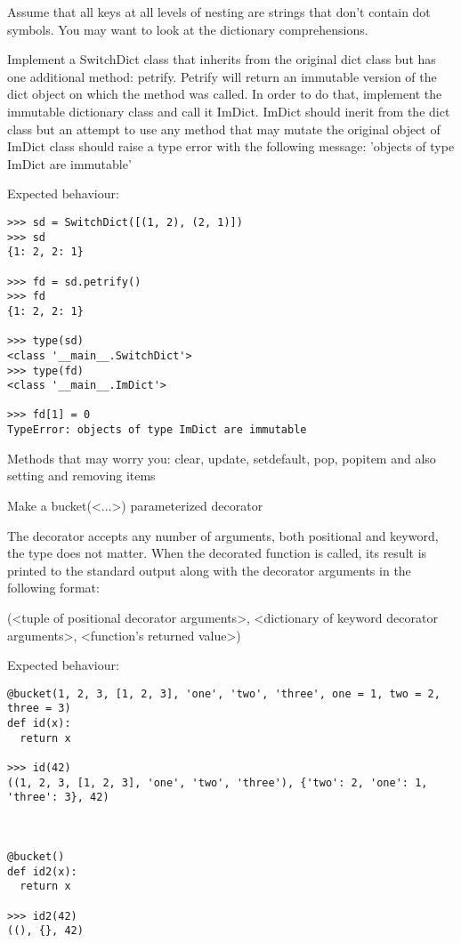 \documentclass[]{article}
\begin{document}
Assume that all keys at all levels of nesting are strings that don't contain dot symbols.
You may want to look at the dictionary comprehensions.

\item
Implement a SwitchDict class that inherits from the original dict class but has one additional method: petrify. Petrify will return an immutable version of the dict object on which the method was called. In order to do that, implement the immutable dictionary class and call it ImDict. ImDict should inerit from the dict class but an attempt to use any method that may mutate the original object of ImDict class should raise a type error with the following message: 'objects of type ImDict are immutable'

Expected behaviour:
\begin{verbatim}
>>> sd = SwitchDict([(1, 2), (2, 1)])
>>> sd
{1: 2, 2: 1}

>>> fd = sd.petrify()
>>> fd
{1: 2, 2: 1}

>>> type(sd)
<class '__main__.SwitchDict'>
>>> type(fd)
<class '__main__.ImDict'>

>>> fd[1] = 0
TypeError: objects of type ImDict are immutable
\end{verbatim}

Methods that may worry you: clear, update, setdefault, pop, popitem and also setting and removing items
\item


Make a bucket(<...>) parameterized decorator

The decorator accepts any number of arguments, both positional and keyword, the type does not matter. When the decorated function is called, its result is printed to the standard output along with the decorator arguments in the following format:

(<tuple of positional decorator arguments>, <dictionary of keyword decorator arguments>, <function's returned value>)

 

Expected behaviour:
\begin{verbatim}
@bucket(1, 2, 3, [1, 2, 3], 'one', 'two', 'three', one = 1, two = 2, three = 3)
def id(x):
  return x

>>> id(42)
((1, 2, 3, [1, 2, 3], 'one', 'two', 'three'), {'two': 2, 'one': 1, 'three': 3}, 42)



@bucket()
def id2(x):
  return x

>>> id2(42)
((), {}, 42)
\end{verbatim}
\end{document}
